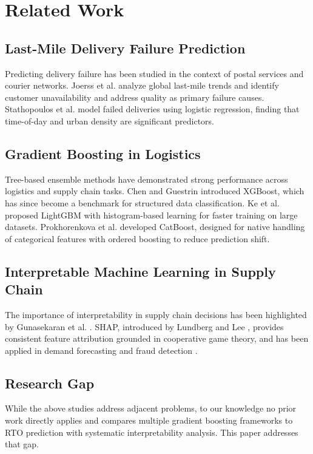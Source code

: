 \documentclass[conference]{IEEEtran}
\begin{document}
\section{Related Work}
\label{sec:related}

\subsection{Last-Mile Delivery Failure Prediction}
Predicting delivery failure has been studied in the context of postal services and courier networks. Joerss et al. \cite{joerss2016} analyze global last-mile trends and identify customer unavailability and address quality as primary failure causes. Stathopoulos et al. \cite{stathopoulos2011} model failed deliveries using logistic regression, finding that time-of-day and urban density are significant predictors.

\subsection{Gradient Boosting in Logistics}
Tree-based ensemble methods have demonstrated strong performance across logistics and supply chain tasks. Chen and Guestrin \cite{chen2016} introduced XGBoost, which has since become a benchmark for structured data classification. Ke et al. \cite{ke2017} proposed LightGBM with histogram-based learning for faster training on large datasets. Prokhorenkova et al. \cite{prokhorenkova2018} developed CatBoost, designed for native handling of categorical features with ordered boosting to reduce prediction shift.

\subsection{Interpretable Machine Learning in Supply Chain}
The importance of interpretability in supply chain decisions has been highlighted by Gunasekaran et al. \cite{gunasekaran2017}. SHAP, introduced by Lundberg and Lee \cite{lundberg2017}, provides consistent feature attribution grounded in cooperative game theory, and has been applied in demand forecasting \cite{marz2020} and fraud detection \cite{ahmed2016}.

\subsection{Research Gap}
While the above studies address adjacent problems, to our knowledge no prior work directly applies and compares multiple gradient boosting frameworks to RTO prediction with systematic interpretability analysis. This paper addresses that gap.
\end{document}
